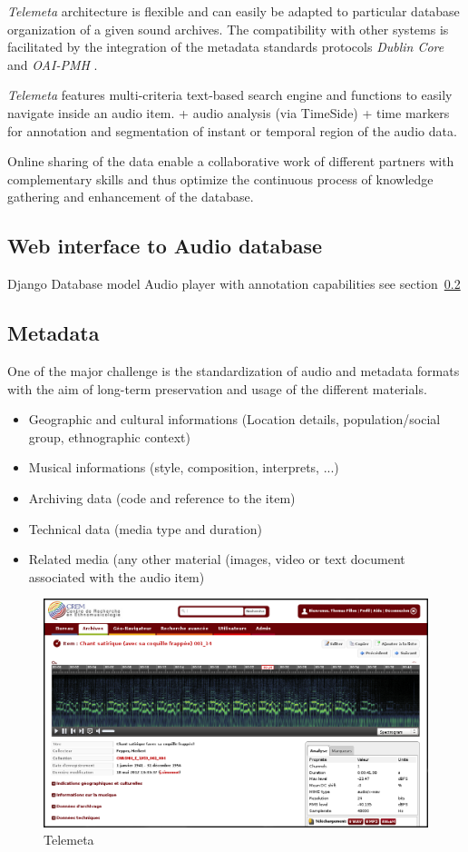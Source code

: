 \documentclass[runningheads,a4paper]{llncs}
\begin{document}
\emph{Telemeta} architecture is flexible and can easily be adapted to particular database organization of a given sound archives. The compatibility with other systems is facilitated by the integration of the metadata standards protocols \emph{Dublin Core} and \emph{OAI-PMH} \cite{DublinCore,OAI-PMH}.

\emph{Telemeta} features multi-criteria text-based search engine and functions to easily navigate inside an audio item.
+ audio analysis (via TimeSide)
+ time markers for annotation and segmentation of instant or temporal region of the audio data.

Online sharing of the data enable a collaborative work of different partners with complementary skills and thus optimize the continuous process of knowledge gathering and enhancement of the database.

\subsection{Web interface to Audio database}
Django
Database model
Audio player with annotation capabilities see section~\ref{sec:metadata}
\subsection{Metadata}\label{sec:metadata}

One of the major challenge is the standardization of audio and metadata formats with the aim of long-term preservation and usage of the different materials. 

\begin{itemize}
\item Geographic and cultural informations (Location details, population/social group, ethnographic context)
\item Musical informations (style, composition, interprets, ...)
\item Archiving data (code and reference to the item)
\item Technical data (media type and duration)
\item Related media (any other material (images, video or text document associated with the audio item)
\end{itemize}


\begin{figure}[htbp]
  \centering
  \includegraphics[width=12cm]{img/telemeta.png}
  \caption{Telemeta}
\end{figure}
\end{document}
